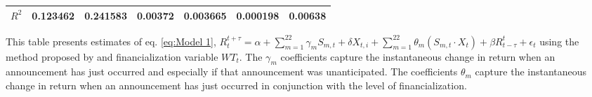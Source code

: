 \begin{sidewaystable}
{\begin{tabular}{@{}lllllllllllll@{}}
 \\ \textbf{$R^2$}             &\multicolumn{2}{c}{ 0.123462 }                                                 & \multicolumn{2}{c}{ 0.241583 }                                                 & \multicolumn{2}{c}{ 0.00372 }                                                 & \multicolumn{2}{c}{ 0.003665 }                                                 & \multicolumn{2}{c}{ 0.000198 }                                                   & \multicolumn{2}{c}{ 0.00638 }                                                 \\ \bottomrule 
\end{tabular}
}
\begin{tablenotes}\item 
    \singlespacing
    \footnotesize
    This table presents estimates of eq. \ref{eq:Model 1}, $R_{t}^{t+\tau}=\alpha+\sum_{m=1}^{22} \gamma_m S_{m,t}+ \delta X_{t,i} + \sum_{m=1}^{22} \theta_m (S_{m,t} \cdot X_t)+\beta R_{t-\tau}^{t}+\epsilon_{t}$ using the method proposed by \citet{kurov2019price} and financialization variable $WT_t$. The $\gamma_m$ coefficients capture the instantaneous change in return when an announcement has just occurred and especially if that announcement was unanticipated. The coefficients $\theta_m$ capture the instantaneous change in return when an announcement has just occurred in conjunction with the level of financialization.
\end{tablenotes}
\end{sidewaystable}


